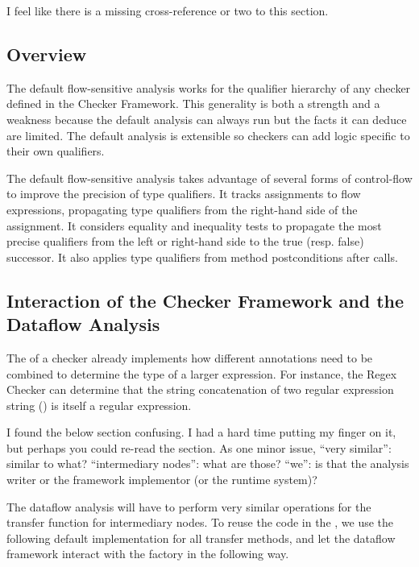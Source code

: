 \begin{workinprogress}
I feel like there is a missing cross-reference or two to this section.
\end{workinprogress}

\subsection{Overview}

The default flow-sensitive analysis  works for the qualifier hierarchy of any checker defined in 
the Checker Framework.  This generality is both a strength and a weakness because the 
default analysis can
always run but the facts it can deduce are limited.  The default analysis
is extensible so checkers can add logic specific to their own qualifiers.

The default flow-sensitive analysis takes advantage of several forms of control-flow to improve the precision of type qualifiers.  It tracks assignments to flow expressions, propagating type qualifiers from the right-hand side of the assignment.  It considers equality and inequality tests to propagate the most precise qualifiers from the left or right-hand side to the true (resp. false) successor.  It also applies type qualifiers from method postconditions after calls.



\subsection{Interaction of the Checker Framework and the Dataflow Analysis}
\label{sec:flow-cf-interaction}

The  of a checker already implements how different annotations
need to be combined to determine the type of a larger expression.  For instance,
the Regex Checker can determine that the string concatenation of two regular expression
string () is itself a regular expression.

\begin{workinprogress}
I found the below section confusing.  I had a hard time putting my finger
on it, but perhaps you could re-read the section.  As one minor issue,
``very similar'':  similar to what?  ``intermediary nodes'':  what are
those?  ``we'':  is that the analysis writer or the framework implementor
(or the runtime system)?
\end{workinprogress}

The dataflow analysis will have to perform very similar operations for the transfer function
for intermediary nodes.  To reuse the code in the , we
use the following default implementation for all transfer methods, and let
the dataflow framework interact with the factory in the following way.

